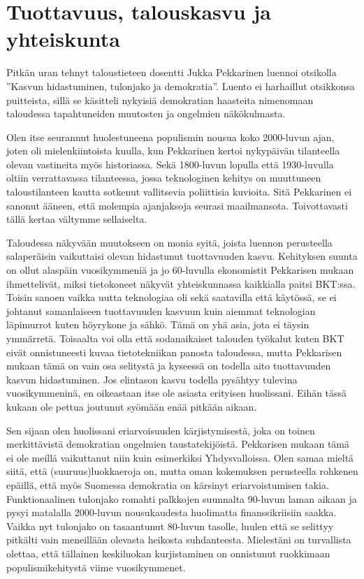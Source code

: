 \documentclass[12pt]{article}
\begin{document}
\newpage
\section{Tuottavuus, talouskasvu ja yhteiskunta}

Pitkän uran tehnyt taloustieteen dosentti Jukka Pekkarinen luennoi otsikolla ''Kasvun hidastuminen, tulonjako ja demokratia''. Luento ei harhaillut otsikkonsa puitteista, sillä se käsitteli nykyisiä demokratian haasteita nimenomaan taloudessa tapahtuneiden muutosten ja ongelmien näkökulmasta.

Olen itse seurannut huolestuneena populismin nousua koko 2000-luvun ajan, joten oli mielenkiintoista kuulla, kun Pekkarinen kertoi nykypäivän tilanteella olevan vastineita myös historiassa. Sekä 1800-luvun lopulla että 1930-luvulla oltiin verrattavassa tilanteessa, jossa teknologinen kehitys on muuttuneen taloustilanteen kautta sotkenut vallitsevia poliittisia kuvioita. Sitä Pekkarinen ei sanonut ääneen, että molempia ajanjaksoja seurasi maailmansota. Toivottavasti tällä kertaa vältymme sellaiselta.

Taloudessa näkyvään muutokseen on monia syitä, joista luennon perusteella salaperäisin vaikuttaisi olevan hidastunut tuottavuuden kasvu. Kehityksen suunta on ollut alaspäin vuosikymmeniä ja jo 60-luvulla ekonomistit Pekkarisen mukaan ihmettelivät, miksi tietokoneet näkyvät yhteiskunnassa kaikkialla paitsi BKT:ssa. Toisin sanoen vaikka uutta teknologiaa oli sekä saatavilla että käytössä, se ei johtanut samanlaiseen tuottavuuden kasvuun kuin aiemmat teknologian läpimurrot kuten höyrykone ja sähkö. Tämä on yhä asia, jota ei täysin ymmärretä. Toisaalta voi olla että sodanaikaiset talouden työkalut kuten BKT eivät onnistuneesti kuvaa tietotekniikan panosta taloudessa, mutta Pekkarisen mukaan tämä on vain osa selitystä ja kyseessä on todella aito tuottavuuden kasvun hidastuminen. Jos elintason kasvu todella pysähtyy tulevina vuosikymmeninä, en oikeastaan itse ole asiasta erityisen huolissani. Eihän tässä kukaan ole pettua joutunut syömään enää pitkään aikaan.

Sen sijaan olen huolissani eriarvoisuuden kärjistymisestä, joka on toinen merkittävistä demokratian ongelmien taustatekijöistä. Pekkarisen mukaan tämä ei ole meillä vaikuttanut niin kuin esimerkiksi Yhdysvalloissa. Olen samaa mieltä siitä, että (suuruus)luokkaeroja on, mutta oman kokemuksen perusteella rohkenen epäillä, että myös Suomessa demokratia on kärsinyt eriarvoistumisen takia. Funktionaalinen tulonjako romahti palkkojen suunnalta 90-luvun laman aikaan ja pysyi matalalla 2000-luvun nousukaudesta huolimatta finanssikriisiin saakka. Vaikka nyt tulonjako on tasaantunut 80-luvun tasolle, luulen että se selittyy pitkälti vain meneillään olevasta heikosta suhdanteesta. Mielestäni on turvallista olettaa, että tällainen keskiluokan kurjistaminen on onnistunut ruokkimaan populismikehitystä viime vuosikymmenet.
\end{document}

